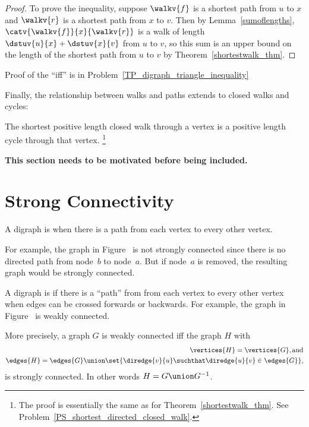 \begin{proof}
  To prove the inequality, suppose $\walkv{f}$ is a shortest path from
  $u$ to $x$ and $\walkv{r}$ is a shortest path from $x$ to $v$.  Then
  by Lemma~\ref{sumoflengths}, $\catv{\walkv{f}}{x}{\walkv{r}}$ is a
  walk of length $\dstuv{u}{x} + \dstuv{x}{v}$ from $u$ to $v$, so
  this sum is an upper bound on the length of the shortest path from
  $u$ to $v$ by Theorem~\ref{shortestwalk_thm}.
\end{proof}

Proof of the ``iff'' is in Problem~\ref{TP_digraph_triangle_inequality}
  
Finally, the relationship between walks and paths extends to closed walks and
cycles:
\begin{lemma}\label{shortestclosedwalk_lem}
The shortest positive length closed walk through a vertex is a
positive length cycle through that vertex. \footnote{The proof is
  essentially the same as for Theorem~\ref{shortestwalk_thm}.  See
  Problem~\ref{PS_shortest_directed_closed_walk}.}
\end{lemma}

\begin{editingnotes}

\textbf{This section needs to be motivated before being included.}

\section{Strong Connectivity}

\begin{definition}
A digraph is  when there is a path from each
vertex to every other vertex.
\end{definition}

For example, the graph in Figure~%
is not strongly connected since there is no directed path from
node~$b$ to node~$a$.  But if node~$a$ is removed, the resulting graph
would be strongly connected.

A digraph is  \iffalse or, more simply,
\emph{connected})\fi if there is a ``path'' from from each vertex to
every other vertex when edges can be crossed forwards or backwards.
For example, the graph in Figure~%
is weakly connected.

More precisely, a graph $G$ is weakly connected iff the graph $H$ with
\begin{align*}
\vertices{H} = \vertices{G}, \text{and}\\
\edges{H} = \edges{G} \union \set{\diredge{v}{u} \suchthat \diredge{u}{v} \in \edges{G}},
\end{align*}
is strongly connected.  In other words $H = G \union G^{-1}$.
\end{editingnotes}

